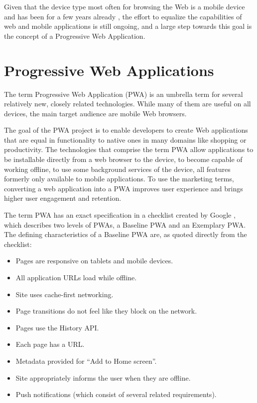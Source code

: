 \documentclass[english,zadani,odsaz]{fitthesis}
\begin{document}
Given that the device type most often for browsing the Web is a mobile device
and has been for a few years already \cite{mobile-stats}, the effort to equalize
the capabilities of web and mobile applications is still ongoing, and a large
step towards this goal is the concept of a Progressive Web Application.

\section{Progressive Web Applications}
\label{sec:org42be0c2}
The term Progressive Web Application (PWA) is an umbrella term for several
relatively new, closely related technologies. While many of them are useful on
all devices, the main target audience are mobile Web browsers.

The goal of the PWA project is to enable developers to create Web applications
that are equal in functionality to native ones in many domains like shopping or
productivity. The technologies that comprise the term PWA allow applications to
be installable directly from a web browser to the device, to become capable of
working offline, to use some background services of the device, all features
formerly only available to mobile applications. To use the marketing terms,
converting a web application into a PWA improves user experience and brings
higher user engagement and retention.

The term PWA has an exact specification in a checklist created by Google
\cite{pwa_checklist}, which describes two levels of PWAs, a Baseline PWA and an
Exemplary PWA. The defining characteristics of a Baseline PWA are, as quoted
directly from the checklist:

\begin{itemize}
\item Pages are responsive on tablets and mobile devices.
\item All application URLs load while offline.
\item Site uses cache-first networking.
\item Page transitions do not feel like they block on the network.
\item Pages use the History API.
\item Each page has a URL.
\item Metadata provided for ``Add to Home screen''.
\item Site appropriately informs the user when they are offline.
\item Push notifications (which consist of several related requirements).
\end{itemize}
\end{document}
